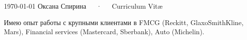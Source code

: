 \documentclass[11pt, a4paper]{awesome-cv}
\begin{document}
\makecvheader[C]

\makecvfooter
  {\today}
  {Оксана Спирина~~~·~~~Curriculum Vitæ}
  {\thepage}


%
%
%
%
%
%
%
%


\begin{cvparagraph}
	Имею опыт работы с крупными клиентами в FMCG (Reckitt, GlaxoSmithKline, Mars), Financial services (Mastercard, Sberbank), Auto (Michelin).
\end{cvparagraph}
\end{document}
